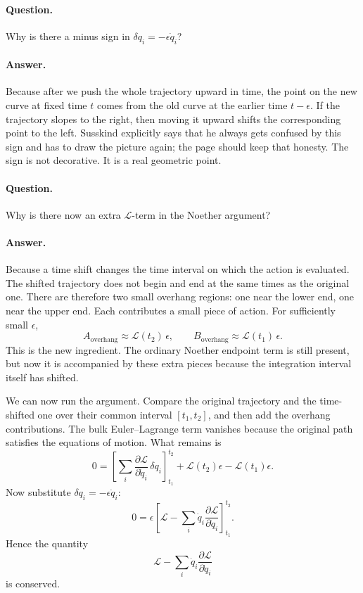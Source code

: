 \paragraph{Question.} Why is there a minus sign in \(\delta q_i=-\epsilon \dot q_i\)?

\paragraph{Answer.} Because after we push the whole trajectory upward in time, the point on the new curve at fixed time \(t\) comes from the old curve at the earlier time \(t-\epsilon\). If the trajectory slopes to the right, then moving it upward shifts the corresponding point to the left. Susskind explicitly says that he always gets confused by this sign and has to draw the picture again; the page should keep that honesty. The sign is not decorative. It is a real geometric point.

\paragraph{Question.} Why is there now an extra \(\mathcal{L}\)-term in the Noether argument?

\paragraph{Answer.} Because a time shift changes the time interval on which the action is evaluated. The shifted trajectory does not begin and end at the same times as the original one. There are therefore two small overhang regions: one near the lower end, one near the upper end. Each contributes a small piece of action. For sufficiently small \(\epsilon\),
\begin{equation}
A_{\text{overhang}}\approx \mathcal{L}(t_2)\,\epsilon,
\qquad
B_{\text{overhang}}\approx \mathcal{L}(t_1)\,\epsilon.
\end{equation}
This is the new ingredient. The ordinary Noether endpoint term is still present, but now it is accompanied by these extra pieces because the integration interval itself has shifted.

We can now run the argument. Compare the original trajectory and the time-shifted one over their common interval \([t_1,t_2]\), and then add the overhang contributions. The bulk Euler--Lagrange term vanishes because the original path satisfies the equations of motion. What remains is
\begin{equation}
0
=
\left[
\sum_i
\frac{\partial \mathcal{L}}{\partial \dot q_i}\,\delta q_i
\right]_{t_1}^{t_2}
+
\mathcal{L}(t_2)\epsilon
-
\mathcal{L}(t_1)\epsilon.
\end{equation}
Now substitute \(\delta q_i=-\epsilon \dot q_i\):
\begin{equation}
0
=
\epsilon
\left[
\mathcal{L}
-
\sum_i
\dot q_i
\frac{\partial \mathcal{L}}{\partial \dot q_i}
\right]_{t_1}^{t_2}.
\end{equation}
Hence the quantity
\begin{equation}
\mathcal{L}
-
\sum_i
\dot q_i
\frac{\partial \mathcal{L}}{\partial \dot q_i}
\end{equation}
is conserved.

